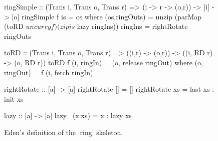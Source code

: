 \begin{figure}[h]
\begin{code}
ringSimple :: (Trans i, Trans o, Trans r) => (i -> r -> (o,r)) -> [i] -> [o]
ringSimple f is =  os
  where (os,ringOuts) = unzip (parMap (toRD $ uncurry f) (zip is $ lazy ringIns))
        ringIns = rightRotate ringOuts

toRD :: (Trans i, Trans o, Trans r) => ((i,r) -> (o,r)) -> ((i, RD r) -> (o, RD r))
toRD  f (i, ringIn)  = (o, release ringOut)
  where (o, ringOut) = f (i, fetch ringIn)

rightRotate    :: [a] -> [a]
rightRotate [] =  []
rightRotate xs =  last xs : init xs

lazy :: [a] -> [a]
lazy ~(x:xs) = x : lazy xs
\end{code}
\caption{Eden's definition of the |ring| skeleton.}
\label{fig:ringEden}
\end{figure}

